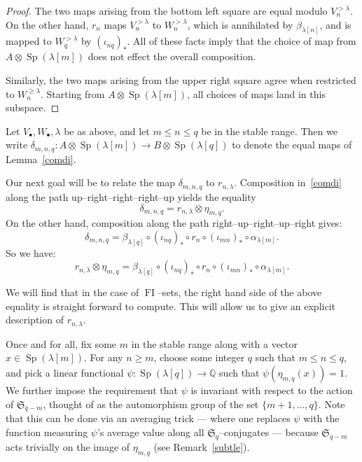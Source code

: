 \documentclass[ALCO,ThmDefs,Unicode,epreuves]{cedram}
\DeclareMathOperator{\FI}{FI}
\DeclareMathOperator{\Sp}{Sp}
\newcommand{\Sn}{\mathfrak{S}}
\newcommand{\as}{\text{*}}
\newcommand{\Q}{\mathbb{Q}}
\newcommand{\dt}{\bullet}
\begin{document}
\begin{proof}
The two maps arising from the bottom left square are equal modulo $V^{> \lambda}_n$. On the other hand, $r_n$ maps $V^{> \lambda}_n$ to $W^{> \lambda}_n$, which is annihilated by $\beta_{\lambda[n]}$, and is mapped to $W^{> \lambda}_q$ by $(\iota_{nq})_\as$. All of these facts imply that the choice of map from $A \otimes \Sp(\lambda[m])$ does not effect the overall composition.

Similarly, the two maps arising from the upper right square agree when restricted to $W^{\geq \lambda}_n$. Starting from $A \otimes \Sp(\lambda[m])$, all choices of maps land in this subspace.
\end{proof}

\begin{definition}
Let $V_\dt,W_\dt,\lambda$ be as above, and let $m \leq n \leq q$ be in the stable range. Then we write $\delta_{m,n,q}: A \otimes \Sp(\lambda[m]) \rightarrow B \otimes \Sp(\lambda[q])$ to denote the equal maps of Lemma~\ref{comdi}.
\end{definition}

Our next goal will be to relate the map $\delta_{m,n,q}$ to $r_{n,\lambda}$. Composition in~\eqref{comdi} along the path up--right--right--right--up yields the equality
\[
\delta_{m,n,q} = r_{n,\lambda} \otimes \eta_{m,q}.
\]
On the other hand, composition along the path right--up--right--up--right gives:
\[
\delta_{m,n,q} = \beta_{\lambda[q]} \circ (\iota_{nq})_\ast \circ r_n \circ (\iota_{mn})_\ast \circ \alpha_{\lambda[m]}.
\]
So we have:
\begin{equation}
r_{n,\lambda} \otimes \eta_{m,q} = \beta_{\lambda[q]} \circ (\iota_{nq})_\ast \circ r_n \circ (\iota_{mn})_\ast \circ \alpha_{\lambda[m]}.\label{key}
\end{equation}

We will find that in the case of $\FI$--sets, the right hand side of the above equality is straight forward to compute. This will allow us to give an explicit description of $r_{n,\lambda}$.

Once and for all, fix some $m$ in the stable range along with a vector $x \in \Sp(\lambda[m])$. For any $n \geq m$, choose some integer $q$ such that $m \leq n \leq q$, and pick a linear functional $\psi: \Sp(\lambda[q]) \rightarrow \Q$ such that $\psi(\eta_{m,q}(x)) = 1$. We further impose the requirement that $\psi$ is invariant with respect to the action of $\Sn_{q-m}$, thought of as the automorphism group of the set $\{m+1,\ldots,q\}$. Note that this can be done via an averaging trick --- where one replaces $\psi$ with the function measuring $\psi$'s average value along all $\Sn_q$--conjugates --- because $\Sn_{q-m}$ acts trivially on the image of $\eta_{m,q}$ (see Remark~\ref{subtle}).
\end{document}
